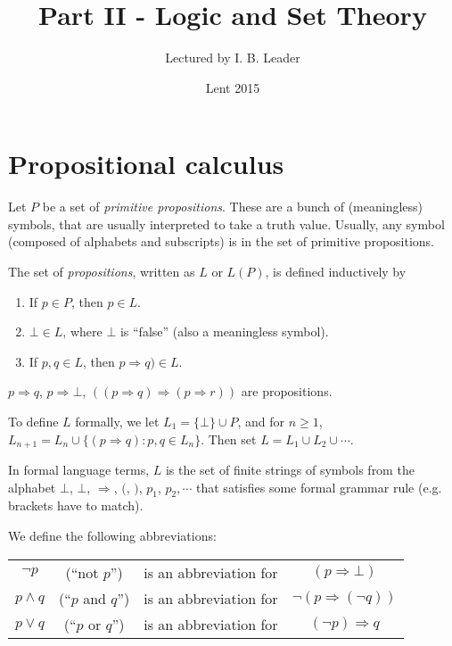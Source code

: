 \documentclass[a4paper]{article}
\title{Part II - Logic and Set Theory}
\author{Lectured by I. B. Leader}
\date{Lent 2015}
\begin{document}
\maketitle
{\small
}

\tableofcontents

\section{Propositional calculus}
\begin{defi}[Propositions]
  Let $P$ be a set of \emph{primitive propositions}. These are a bunch of (meaningless) symbols, that are usually interpreted to take a truth value. Usually, any symbol (composed of alphabets and subscripts) is in the set of primitive propositions.

  The set of \emph{propositions}, written as $L$ or $L(P)$, is defined inductively by
  \begin{enumerate}
    \item If $p\in P$, then $p\in L$.
    \item $\bot\in L$, where $\bot$ is ``false'' (also a meaningless symbol).
    \item If $p, q\in L$, then $p\Rightarrow q)\in L$.
  \end{enumerate}
\end{defi}

\begin{eg}
  $p\Rightarrow q$, $p\Rightarrow \bot$, $((p\Rightarrow q)\Rightarrow (p\Rightarrow r))$ are propositions.
\end{eg}

To define $L$ formally, we let $L_1 = \{\bot\}\cup P$, and for $n\geq 1$, $L_{n + 1} = L_n\cup \{(p\Rightarrow q): p, q\in L_n\}$. Then set $L = L_1\cup L_2\cup \cdots$.

In formal language terms, $L$ is the set of finite strings of symbols from the alphabet $\bot$, $\bot$, $\Rightarrow $, $($, $)$, $p_1$, $p_2, \cdots$ that satisfies some formal grammar rule (e.g. brackets have to match).

We define the following abbreviations:
\begin{defi}\leavevmode
  \begin{center}
    \begin{tabular}[]{cccc}
      $\neg p$ & (``not $p$'') & is an abbreviation for & $(p\Rightarrow \bot)$\\
      $p\wedge q$ & (``$p$ and $q$'') & is an abbreviation for & $\neg(p\Rightarrow (\neg q))$\\
      $p\vee q$ & (``$p$ or $q$'') & is an abbreviation for & $(\neg p)\Rightarrow q$
    \end{tabular}
  \end{center}
\end{defi}
\end{document}
